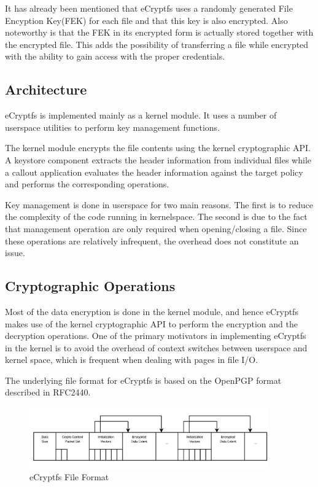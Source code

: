 It has already been mentioned that eCryptfs uses a randomly generated File Encyption Key(FEK) for each file and that this key is also encrypted. Also noteworthy is that the FEK in its encrypted form is actually stored together with the encrypted file. This adds the possibility of transferring a file while encrypted with the ability to gain access with the proper credentials.

\subsection{Architecture}
\label{sub-sec:arch-ecryptfs}

eCryptfs is implemented mainly as a kernel module. It uses a number of userspace utilities to perform key management functions.


The kernel module encrypts the file contents using the kernel cryptographic API. A keystore component extracts the header information from individual files while a callout application evaluates the header information against the target policy and performs the corresponding operations.

Key management is done in userspace for two main reasons. The first is to reduce the complexity of the code running in kernelspace. The second is due to the fact that management operation are only required when opening/closing a file. Since these operations are relatively infrequent, the overhead does not constitute an issue.

\subsection{Cryptographic Operations}
\label{sub-sec:crypt-ops-ecryptfs}

Most of the data encryption is done in the kernel module, and hence eCryptfs makes use of the kernel cryptographic API to perform the encryption and the decryption operations. One of the primary motivators in implementing eCryptfs in the kernel is to avoid the overhead of context switches between userspace and kernel space, which is frequent when dealing with pages in file I/O.

The underlying file format for eCryptfs is based on the OpenPGP format described in RFC2440\cite{rfc}.

\begin{figure}[h!]
\centering
    \includegraphics[width=0.92\textwidth]{src/img/ecryptfs/fileformat.png}
\caption{eCryptfs File Format\cite{ecryptfs-paper}}
\end{figure}

